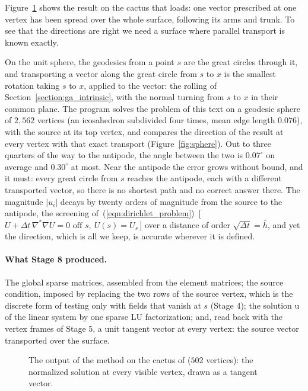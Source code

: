 Figure~\ref{fig:cactus} shows the result on the cactus that  loads: one vector prescribed at one vertex has been spread over the whole surface, following its arms and trunk. To see that the directions are right we need a surface where parallel transport is known exactly.

\begin{example}
\label{ex:sphere}
On the unit sphere, the geodesics from a point $s$ are the great circles through it, and transporting a vector along the great circle from $s$ to $x$ is the smallest rotation taking $s$ to $x$, applied to the vector: the rolling of Section~\ref{section:ga_intrinsic}, with the normal turning from $s$ to $x$ in their common plane. The program  solves the problem of this text on a geodesic sphere of $2{,}562$ vertices (an icosahedron subdivided four times, mean edge length $0.076$), with the source at its top vertex, and compares the direction of the result at every vertex with that exact transport (Figure~\ref{fig:sphere}). Out to three quarters of the way to the antipode, the angle between the two is $0.07^\circ$ on average and $0.30^\circ$ at most. Near the antipode the error grows without bound, and it must: every great circle from $s$ reaches the antipode, each with a different transported vector, so there is no shortest path and no correct answer there. The magnitude $|u_i|$ decays by twenty orders of magnitude from the source to the antipode, the screening of~(\ref{eqn:dirichlet_problem})~[\,$U + \Delta t\,\nabla^*\nabla U = 0 \text{ off } s,\ U(s) = U_s$\,] over a distance of order $\sqrt{\Delta t} = \bar h$, and yet the direction, which is all we keep, is accurate wherever it is defined.
\end{example}

\paragraph{What Stage 8 produced.} The global sparse matrices, assembled from the element matrices; the source condition, imposed by replacing the two rows of the source vertex, which is the discrete form of testing only with fields that vanish at $s$ (Stage 4); the solution $\mathrm u$ of the linear system by one sparse LU factorization; and, read back with the vertex frames of Stage 5, a unit tangent vector at every vertex: the source vector transported over the surface.

\begin{figure}[t]
\centering
{}
\caption{The output of the method on the cactus of  ($502$ vertices): the normalized solution at every visible vertex, drawn as a tangent vector.}
\label{fig:cactus}
\end{figure}


